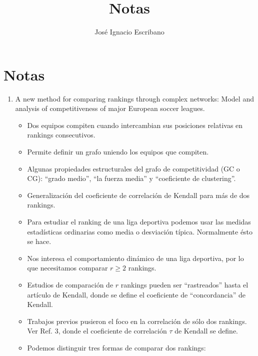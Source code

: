 \documentclass[10pt,a4paper]{article}
\author{José Ignacio Escribano}
\title{Notas}
\begin{document}
\maketitle

\section{Notas}

\begin{enumerate}
\item A new method for comparing rankings through complex networks: Model and analysis of competitiveness of major European soccer leagues.
	\begin{itemize}
		\item Dos equipos compiten cuando intercambian sus posiciones relativas en rankings consecutivos.
		\item Permite definir un grafo uniendo los equipos que compiten.
		\item Algunas propiedades estructurales del grafo de competitividad (GC o CG): ``grado medio'', ``la fuerza media'' y ``coeficiente de clustering''.
		\item Generalización del coeficiente de correlación de Kendall para más de dos rankings.
		\item Para estudiar el ranking de una liga deportiva podemos usar las medidas estadísticas ordinarias como media o desviación típica. Normalmente ésto se hace.
		\item Nos interesa el comportamiento dinámico de una liga deportiva, por lo que necesitamos comparar $r \geq 2$ rankings. 
		\item Estudios de comparación de $r$ rankings pueden ser ``rastreados'' hasta el artículo de Kendall, donde se define el coeficiente de ``concordancia'' de Kendall. 
		\item Trabajos previos pusieron el foco en la correlación de sólo dos rankings. Ver Ref. 3, donde el coeficiente de correlación $\tau$ de Kendall se define. 
		\item Podemos distinguir tres formas de comparar dos rankings:
		

\end{itemize}
\end{enumerate}
\end{document}
